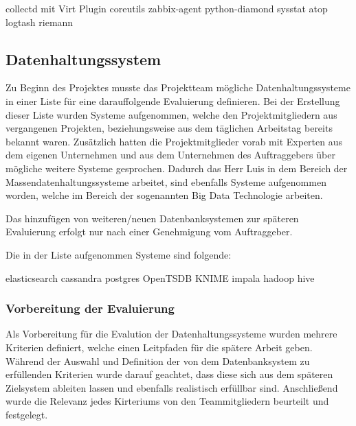 \begin{outline}
  \1 collectd mit Virt Plugin
  \1 coreutils
  \1 zabbix-agent
  \1 python-diamond
  \1 sysstat
  \1 atop
  \1 logtash
  \1 riemann
\end{outline}
\tm%

\subsection{Datenhaltungssystem}
\label{subsec:datenhaltungssystem}
Zu Beginn des Projektes musste das Projektteam mögliche Datenhaltungssysteme in
einer Liste für eine darauffolgende Evaluierung definieren. Bei der Erstellung
dieser Liste wurden Systeme aufgenommen, welche den Projektmitgliedern aus
vergangenen Projekten, beziehungsweise aus dem täglichen Arbeitstag bereits
bekannt waren. Zusätzlich hatten die Projektmitglieder vorab mit Experten aus
dem eigenen Unternehmen und aus dem Unternehmen des Auftraggebers über mögliche
weitere Systeme gesprochen.  Dadurch das Herr Luis in dem Bereich der
Massendatenhaltungssysteme arbeitet, sind ebenfalls Systeme aufgenommen worden,
welche im Bereich der sogenannten Big Data Technologie arbeiten.

Das hinzufügen von weiteren/neuen Datenbanksystemen zur späteren
Evaluierung erfolgt nur nach einer Genehmigung vom Auftraggeber.

Die in der Liste aufgenommen Systeme sind folgende:
\begin{outline}
  \1 elasticsearch
  \1 cassandra
  \1 postgres
  \1 OpenTSDB
  \1 KNIME
  \1 impala
  \1 hadoop
  \1 hive
\end{outline}
\nl%

\subsubsection{Vorbereitung der Evaluierung}
\label{subsubsec:DBS_vorbereitung_der_evaluierung}
Als Vorbereitung für die Evalution der Datenhaltungssysteme wurden mehrere
Kriterien definiert, welche einen Leitpfaden für die spätere Arbeit geben.
Während der Auswahl und Definition der von dem Datenbanksystem zu erfüllenden
Kriterien wurde darauf geachtet, dass diese sich aus dem späteren Zielsystem
ableiten lassen und ebenfalls realistisch erfüllbar sind. Anschließend wurde
die Relevanz jedes Kirteriums von den Teammitgliedern beurteilt und festgelegt.

